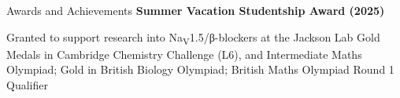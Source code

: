 \begin{rubric}{Awards and Achievements}
%
    \textbf{Summer Vacation Studentship Award (2025)}\par
    Granted to support research into Na\textsubscript{V}1.5/β-blockers at the Jackson Lab
%
%
    Gold Medals in Cambridge Chemistry Challenge (L6), and Intermediate Maths Olympiad; Gold in British Biology Olympiad; British Maths Olympiad Round 1 Qualifier
%
\end{rubric}